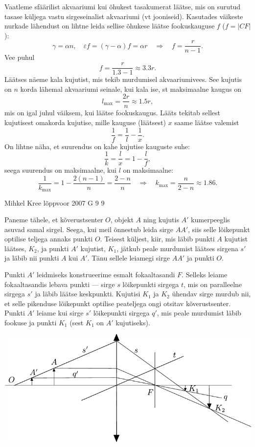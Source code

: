 \documentclass[11pt, twoside]{article}
\begin{document}
{{Vaatleme sfäärilist akvaariumi kui õhukest tasakumerat läätse, mis on surutud tasase küljega vastu sirgeseinalist akvaariumi (vt jooniseid). Kasutades väikeste nurkade lähendust on lihtne leida sellise õhukese läätse fookuskauguse $f$ ($f = |CF|$):
\[
\gamma=\alpha n, \quad \varepsilon f=(\gamma-\alpha) f=\alpha r \quad \Rightarrow \quad f=\frac{r}{n-1}.
\]
Vee puhul
\[
f=\frac{r}{\num{1,3}-\num{1}} \approx \num{3,3} r.
\]
Läätses näeme kala kujutist, mis tekib murdumisel akvaariumivees. See kujutis on $n$ korda lähemal akvaariumi seinale, kui kala ise, st maksimaalne kaugus on
\[
l_{\max }=\frac{2 r}{n} \approx \num{1,5} r,
\]
mis on igal juhul väiksem, kui läätse fookuskaugus. Lääts tekitab sellest kujutisest omakorda kujutise, mille kauguse (läätsest) $x$ saame läätse valemist
\[
\frac{1}{f}=\frac{1}{l}-\frac{1}{x}.
\]
On lihtne näha, et suurendus on kahe kujutise kauguste suhe:
\[
\frac{1}{k}=\frac{l}{x}=1-\frac{l}{f},
\]
seega suurendus on maksimaalne, kui $l$ on maksimaalne:
\[
\frac{1}{k_{\max }}=1-\frac{2(n-1)}{n}=\frac{2-n}{n} \quad\Rightarrow\quad k_{\max }=\frac{n}{2-n} \approx \num{1,86}.
\]
\fi
}

{Mihkel Kree} %
{lõppvoor} %
{2007} %
{G 9} %
{9} %
{

\ifSolution
Paneme tähele, et kõverustsenter $O$, objekt $A$ ning kujutis $A'$ kumerpeeglis asuvad samal sirgel. Seega, kui meil õnnestub leida sirge $AA'$, siis selle lõikepunkt optilise teljega annaks punkti $O$. Teisest küljest, kiir, mis läbib punkti $A$ kujutist läätses, $K_2$, ja punkti $A'$ kujutist, $K_1$, jätkub peale murdumist läätses sirgena $s'$ ja läbib nii punkti $A$ kui $A'$. Tänu sellele leiamegi sirge $AA'$ ja punkti $O$.

Punkti $A'$ leidmiseks konstrueerime esmalt fokaaltasandi $F$. Selleks leiame fokaaltasandis lebava punkti --- sirge $s$ lõikepunkti sirgega $t$, mis on paralleelne sirgega $s'$ ja läbib läätse keskpunkti. Kujutisi $K_1$ ja $K_2$ ühendav sirge murdub nii, et selle pikenduse lõikepunkt optilise peateljega ongi otsitav kõverustsenter. Punkti $A'$ leiame kui sirge $s'$ lõikepunkti sirgega $q'$, mis peale murdumist läbib fookuse ja punkti $K_1$ (sest $K_1$ on $A'$ kujutiseks).


\begin{center}
	\includegraphics[width=\linewidth]{2007-v3g-09-lah}
\end{center}
\fi
}

}
\end{document}
